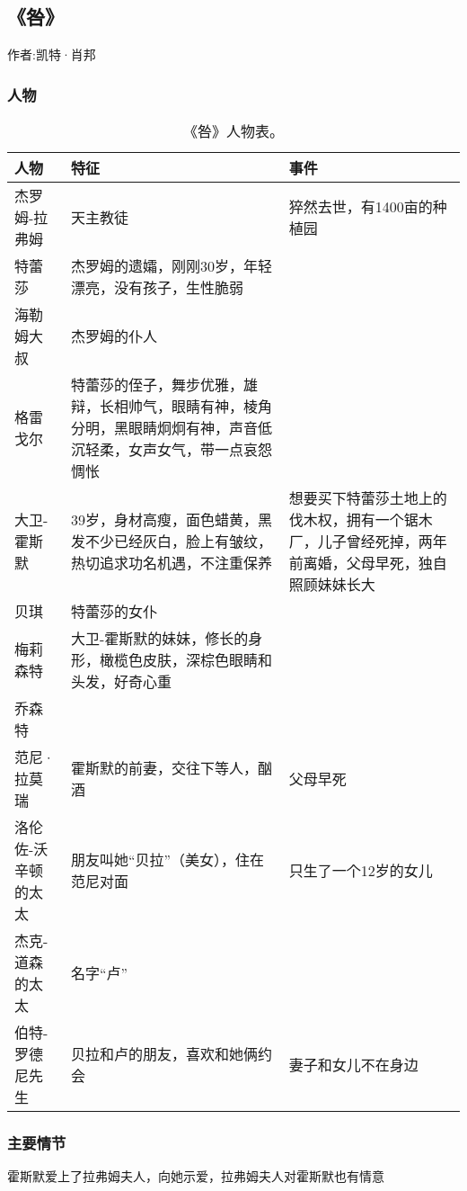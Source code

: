 \subsection{《咎》}

作者:凯特·肖邦

\subsubsection{人物}

\begin{longtable}{p{} | p{} | p{}}
    \caption{《咎》人物表。} \\
\hline
人物 & 特征 & 事件 \\
\hline
\endhead

\hline
\endfoot

杰罗姆-拉弗姆 &天主教徒 & 猝然去世，有1400亩的种植园 \\
特蕾莎 & 杰罗姆的遗孀，刚刚30岁，年轻漂亮，没有孩子，生性脆弱 & \\
海勒姆大叔 & 杰罗姆的仆人 & \\
格雷戈尔 & 特蕾莎的侄子，舞步优雅，雄辩，长相帅气，眼睛有神，棱角分明，黑眼睛炯炯有神，声音低沉轻柔，女声女气，带一点哀怨惆怅 & \\
大卫-霍斯默 & 39岁，身材高瘦，面色蜡黄，黑发不少已经灰白，脸上有皱纹，热切追求功名机遇，不注重保养 & 想要买下特蕾莎土地上的伐木权，拥有一个锯木厂，儿子曾经死掉，两年前离婚，父母早死，独自照顾妹妹长大 \\		
贝琪 & 特蕾莎的女仆	& \\
梅莉森特 & 大卫-霍斯默的妹妹，修长的身形，橄榄色皮肤，深棕色眼睛和头发，好奇心重 & \\	
乔森特	& & \\	
范尼·拉莫瑞 & 霍斯默的前妻，交往下等人，酗酒 & 父母早死 \\
洛伦佐-沃辛顿的太太 & 朋友叫她“贝拉”（美女），住在范尼对面 & 只生了一个12岁的女儿 \\
杰克-道森的太太 & 名字“卢”	& \\
伯特-罗德尼先生 & 贝拉和卢的朋友，喜欢和她俩约会 & 妻子和女儿不在身边 \\

\end{longtable}

\subsubsection{主要情节}
霍斯默爱上了拉弗姆夫人，向她示爱，拉弗姆夫人对霍斯默也有情意

